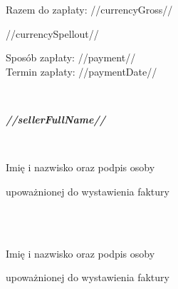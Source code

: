 \documentclass[12pt]{article}
\begin{document}
    \bgroup
    \def\arraystretch{2}
    \begin{table}[htb]
        \label{tab:table}
    \end{table}
    \egroup

    \begin{small}
        \begin{minipage}[t]{.7\textwidth}
            Razem do zapłaty: //currencyGross// \\
            \begin{scriptsize}
                //currencySpellout//
            \end{scriptsize}
        \end{minipage}
        \begin{minipage}[t]{\textwidth}
            Sposób zapłaty: //payment// \\
            Termin zapłaty: //paymentDate//
        \end{minipage}
    \end{small}

    \ \\

    \begin{small}
        \begin{minipage}[t]{.4\textwidth}
            \centerline{
                \textbf{\emph{//sellerFullName//}
                }}
            \ \\
            \vspace{-4ex}
            \hline
            \vspace{.5ex}
            \scriptsize{
                \centerline{Imię i nazwisko oraz podpis osoby}
                \centerline{upoważnionej do wystawienia faktury}
            }
        \end{minipage}
        \hfill
        \begin{minipage}[t]{.4\textwidth}
            \ \\ \\
            \vspace{-4ex}
            \hline
            \vspace{.5ex}
            \scriptsize{
                \centerline{Imię i nazwisko oraz podpis osoby}
                \centerline{upoważnionej do wystawienia faktury}
            }
        \end{minipage}
    \end{small}
\end{document}
